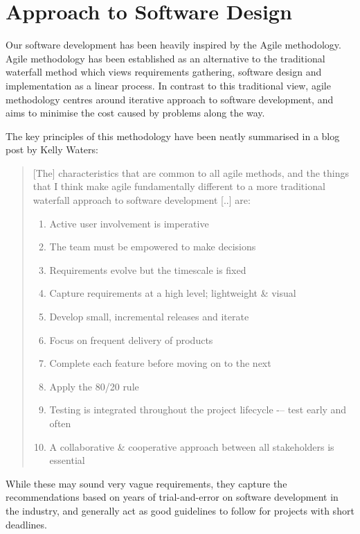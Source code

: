 \section{Approach to Software Design}
\label{sec:design_considerations}

Our software development has been heavily inspired by the Agile methodology\cite{_manifesto_????}. 
Agile methodology has been established as an alternative to the traditional waterfall method which views requirements gathering, software design and implementation as a linear process. 
In contrast to this traditional view, agile methodology centres around iterative approach to software development, and aims to minimise the cost caused by problems along the way.

The key principles of this methodology have been neatly summarised in a blog post by Kelly Waters\cite{_what_????}:

\blockquote{
    [The] characteristics that are common to all agile methods, and the things that I think make agile fundamentally different to a more traditional waterfall approach to software development [..] are:
    
    \begin{enumerate}
        \item Active user involvement is imperative 
        \item The team must be empowered to make decisions 
        \item Requirements evolve but the timescale is fixed 
        \item Capture requirements at a high level; lightweight \& visual 
        \item Develop small, incremental releases and iterate 
        \item Focus on frequent delivery of products 
        \item Complete each feature before moving on to the next 
        \item Apply the 80/20 rule 
        \item Testing is integrated throughout the project lifecycle -– test early and often 
        \item A collaborative \& cooperative approach between all stakeholders is essential 
    \end{enumerate}
}

While these may sound very vague requirements, they capture the recommendations based on years of trial-and-error on software development in the industry, and generally act as good guidelines to follow for projects with short deadlines.

